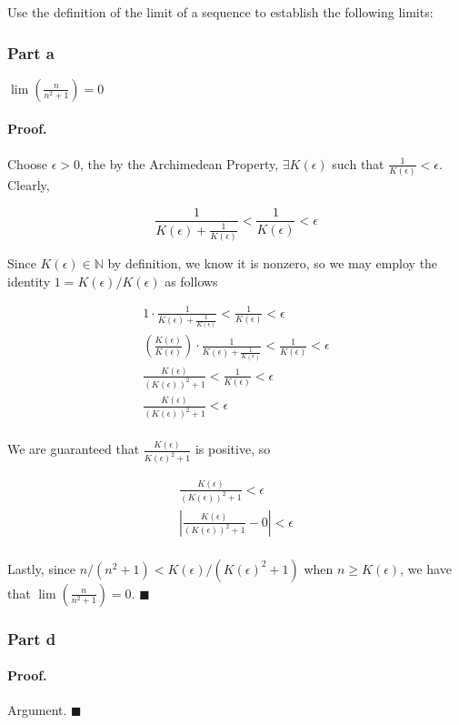 \documentclass[paper=a4, fontsize=11pt]{scrartcl} %
\numberwithin{equation}{section} %
\numberwithin{figure}{section} %
\numberwithin{table}{section} %
\begin{document}
Use the definition of the limit of a sequence to establish the following limits:

\subsubsection*{Part a}

$\lim(\frac{n}{n^2 + 1}) = 0$

\newcommand{\kep}{K(\epsilon)}
\paragraph{Proof.} Choose $\epsilon > 0$, the by the Archimedean Property, $\exists \kep$ such that $\frac{1}{\kep} < \epsilon$. Clearly,

\begin{equation}
\frac{1}{\kep + \frac{1}{\kep}} < \frac{1}{\kep} < \epsilon
\end{equation}

Since $\kep \in \mathbb{N}$ by definition, we know it is nonzero, so we may employ the identity $1 = \kep/\kep$ as follows

\begin{gather*}
1\cdot\frac{1}{\kep + \frac{1}{\kep}} < \frac{1}{\kep} < \epsilon \\
\left(\frac{\kep}{\kep}\right)\cdot\frac{1}{\kep + \frac{1}{\kep}} < \frac{1}{\kep} < \epsilon \\
\frac{\kep}{(\kep)^2 + 1} < \frac{1}{\kep} < \epsilon \\
\frac{\kep}{(\kep)^2 + 1} < \epsilon \\
\end{gather*}

We are guaranteed that $\frac{\kep}{\kep ^2 + 1}$ is positive, so 

\begin{gather*}
\frac{\kep}{(\kep)^2 + 1} < \epsilon \\
\left|\frac{\kep}{(\kep)^2 + 1} - 0\right| < \epsilon \\
\end{gather*}

Lastly, since $n/(n^2 + 1) < \kep/(\kep ^2 + 1)$ when $n \geq \kep$, we have that $\lim(\frac{n}{n^2 + 1}) = 0$. $\blacksquare$\\
\subsubsection*{Part d}
\paragraph{Proof.} Argument. $\blacksquare$\\
\end{document}
